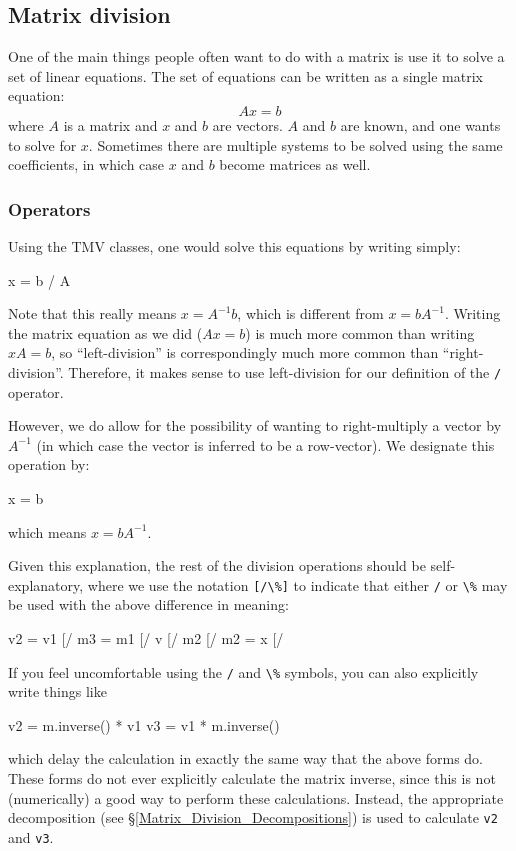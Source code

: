 \documentclass[twoside,letterpaper,11pt]{article}
\renewcommand{\tt}[1]{{\lstinline {#1}}}
\begin{document}
\subsection{Matrix division}
\label{Matrix_Division}

One of the main things people often want to do with a matrix is use it to solve a 
set of linear equations.  The set of equations can be written as a single matrix
equation:
\begin{equation*}
\nonumber
A x = b
\end{equation*}
where $A$ is a matrix and $x$ and $b$ are vectors.  $A$ and $b$ are known, 
and one wants to solve for $x$.  Sometimes there are
multiple systems to be solved using the same coefficients, in which case
$x$ and $b$ become matrices as well.

\subsubsection{Operators}
\label{Matrix_Division_Operators}

Using the TMV classes, one would solve this equations by writing simply:
\begin{tmvcode}
x = b / A
\end{tmvcode}
Note that this really means $x = A^{-1} b$, which is different from $x = b A^{-1}$.
Writing the matrix equation as we did ($A x=b$) is much more common than 
writing $xA=b$, so ``left-division'' is correspondingly much more common than 
``right-division''.  Therefore, it makes sense to use left-division for our definition of the \tt{/}
operator.

However, we do allow for the possibility of wanting to right-multiply a vector
by $A^{-1}$ (in which case the vector is inferred to be a row-vector).  We designate
this operation by:
\begin{tmvcode}
x = b %
\end{tmvcode}
which means $x = b A^{-1}$.

Given this explanation, the rest of the division operations should be self-explanatory,
where we use the notation \tt{[/\%]} to indicate that either \tt{/} or \tt{\%} may
be used with the above difference in meaning:
\begin{tmvcode}
v2 = v1 [/%
m3 = m1 [/%
v [/%
m2 [/%
m2 = x [/%
\end{tmvcode}

If you feel uncomfortable using the \tt{/} and \tt{\%} symbols,
you can also explicitly write things like
\begin{tmvcode}
v2 = m.inverse() * v1
v3 = v1 * m.inverse()
\end{tmvcode}
which delay the calculation in exactly the same way that the above forms do.  
These forms
do not ever explicitly calculate the matrix inverse, since this is not (numerically) a
good way to perform these calculations.  Instead, the appropriate decomposition 
(see \S\ref{Matrix_Division_Decompositions})
is used to calculate \tt{v2} and \tt{v3}.
\end{document}

